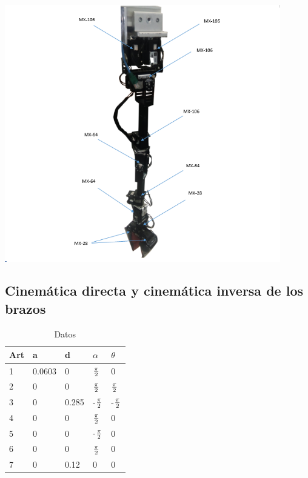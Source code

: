 \documentclass[user_manual.tex]{subfiles}
\begin{document}
\begin{center}
\includegraphics[width=0.9\textwidth]{Figures/Hardware/Diagramas/Brazo.png}
\label{fig:Hardware:Diagramas:Justina:Brazo}
\end{center}

\subsection{Cinemática directa y cinemática inversa de los brazos}
\begin{table}[H]
\begin{center}
\begin{tabular}{l|l l l l}%

Art & a & d & $\alpha$ & $\theta$\\ \hline 
1 & 0.0603 & 0     & $\pi \over 2$ & 0\\
2 & 0      & 0     & $\pi \over 2$ & $\pi \over 2$\\
3 & 0      & 0.285 & -$\pi \over 2$& -$\pi \over 2$\\
4 & 0      & 0     & $\pi \over 2$ & 0\\
5 & 0      & 0     & -$\pi \over 2$& 0\\
6 & 0      & 0     & $\pi \over 2$ & 0\\
7 & 0      & 0.12  &        0      & 0\\
\end{tabular}
\caption{Datos}
\end{center}
\end{table}
\end{document}
